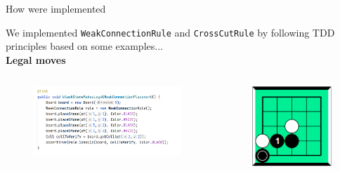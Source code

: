 \documentclass{beamer}
\begin{document}
\begin{frame}[t]{How were implemented}
	
	We implemented \texttt{WeakConnectionRule} and \texttt{CrossCutRule} by following TDD principles based on some examples...\\
	\vspace{0.1cm}
	\textbf{Legal moves}
	\begin{columns}
		\begin{figure}[t]
			\includegraphics[scale=0.2]{images/test-legal-weak.png}
		\end{figure}
		\begin{figure}[t]
			\includegraphics[scale=0.15]{images/legal-move.png}
		\end{figure}
		
	\end{columns}


\end{frame}
\end{document}
